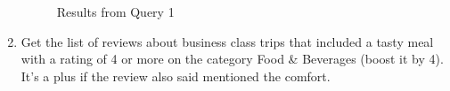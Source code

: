 \documentclass{Configuration_Files/PoliMi3i_thesis}
\begin{document}
\begin{enumerate}
\begin{figure}[H]
    \centering
    \quad
    \label{fig:quadtree2}
    \caption{Results from Query 1}

\end{figure}
\newpage

    \item Get the list of reviews about business class trips that included a tasty meal with a rating of 4 or more on the category Food \& Beverages (boost it by 4). It's a plus if the review also said mentioned the comfort.



\end{enumerate}
\end{document}
